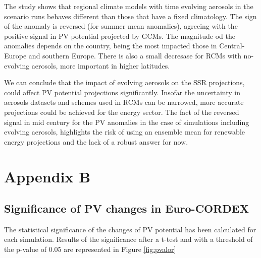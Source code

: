 

The study shows that regional climate models with time evolving aerosols in the scenario runs behaves different than those that have a fixed climatology. The sign of the anomaly is reversed (for summer mean anomalies), agreeing with the positive signal in PV potential projected by GCMs. The magnitude od the anomalies depends on the country, being the most impacted those in Central-Europe and southern Europe. There is also a small decresase for RCMs with no-evolving aerosols, more important in higher latitudes. 

We can conclude that the impact of evolving aerosols on the SSR projections, could affect PV potential projections significantly. Insofar the uncertainty in aerosols datasets and schemes used in RCMs can be narrowed, more accurate projections could be achieved for the energy sector. The fact of the reversed signal in mid century for the PV anomalies in the case of simulations including evolving aerosols, highlights the risk of using an ensemble mean for renewable energy projections and the lack of a robust answer for now.   



\section*{Appendix B}

\subsection*{Significance of PV changes in Euro-CORDEX}

The statistical significance of the changes of PV potential has been calculated for each simulation. Results of the significance after a t-test and with a threshold of the p-value of 0.05 are represented in Figure \ref{fig:pvalor}

